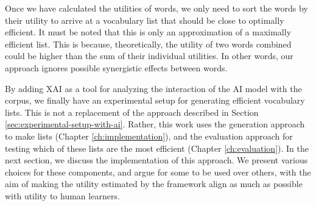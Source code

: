 Once we have calculated the utilities of words, we only need to sort the words by their utility to arrive at a vocabulary list that should be close to optimally efficient.
It must be noted that this is only an approximation of a maximally efficient list.
This is because, theoretically, the utility of two words combined could be higher than the sum of their individual utilities.
In other words, our approach ignores possible synergistic effects between words.

By adding XAI as a tool for analyzing the interaction of the AI model with the corpus, we finally have an experimental setup for generating efficient vocabulary lists.
This is not a replacement of the approach described in Section \ref{sec:experimental-setup-with-ai}.
Rather, this work uses the generation approach to make lists (Chapter \ref{ch:implementation}), and the evaluation approach for testing which of these lists are the most efficient (Chapter \ref{ch:evaluation}).
In the next section, we discuss the implementation of this approach.
We present various choices for these components, and argue for some to be used over others, with the aim of making the utility estimated by the framework align as much as possible with utility to human learners.

